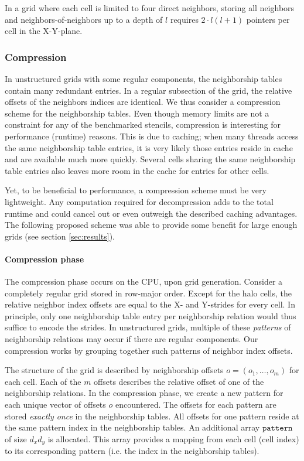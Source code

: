 In a grid where each cell is limited to four direct neighbors, storing all neighbors and neighbors-of-neighbors up to a depth of $l$ requires $2\cdot l(l+1)$ pointers per cell in the X-Y-plane.

\subsubsection{Compression} \label{sec:compression}

In unstructured grids with some regular components, the neighborship tables contain many redundant entries. In a regular subsection of the grid, the relative offsets of the neighbors indices are identical. We thus consider a  compression scheme for the neighborship tables. Even though memory limits are not a constraint for any of the benchmarked stencils, compression is interesting for performance (runtime) reasons. This is due to caching; when many threads access the same neighborship table entries, it is very likely those entries reside in cache and are available much more quickly. Several cells sharing the same neighborship table entries also leaves more room in the cache for entries for other cells.

Yet, to be beneficial to performance, a compression scheme must be very lightweight. Any computation required for decompression adds to the total runtime and could cancel out or even outweigh the described caching advantages. The following proposed scheme was able to provide some benefit for large enough grids (see section \ref{sec:results}). %

\paragraph{Compression phase}

The compression phase occurs on the CPU, upon grid generation. Consider a completely regular grid stored in row-major order. Except for the halo cells, the relative neighbor index offsets are equal to the X- and Y-strides for every cell. In principle, only one neighborship table entry per neighborship relation would thus suffice to encode the strides. In unstructured grids, multiple of these \emph{patterns} of neighborship relations may occur if there are regular components. Our compression works by grouping together such patterns of neighbor index offsets. 

The structure of the grid is described by neighborship offsets $o = (o_1, \dots, o_m)$ for each cell. Each of the $m$ offsets describes the relative offset of one of the neighborship relations. In the compression phase, we create a new pattern for each unique vector of offsets $o$ encountered. The offsets for each pattern are stored \emph{exactly once} in the neighborship tables. All offsets for one pattern reside at the same pattern index in the neighborship tables. An additional array $\mathtt{pattern}$ of size $d_xd_y$ is allocated. This array provides a mapping from each cell (cell index) to its corresponding pattern (i.e. the index in the neighborship tables).

